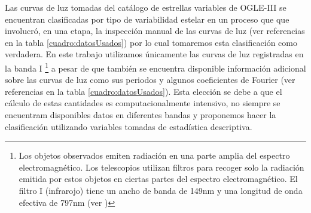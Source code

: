 \documentclass[letterpaper,12pt]{book}
\begin{document}
Las curvas de luz tomadas del catálogo de estrellas variables de OGLE-III se encuentran clasificadas por tipo de variabilidad estelar en un proceso que que involucró, en una etapa, la inspección manual de las curvas de luz (ver referencias en la tabla \ref{cuadro:datosUsados}) por lo cual tomaremos esta clasificación como verdadera. En este trabajo utilizamos únicamente las curvas de luz registradas en la banda I \footnote{Los objetos observados emiten radiación en una parte amplia del espectro electromagnético. Los telescopios utilizan filtros para recoger solo la radiación emitida por estos objetos en ciertas partes del espectro electromagnético. El filtro I (infrarojo) tiene un ancho de banda de 149nm y una longitud de onda efectiva de 797nm (ver \cite{karttunen_fundamental_2007})} a pesar de que también se encuentra disponible información adicional sobre las curvas de luz como sus periodos y algunos coeficientes de Fourier (ver referencias en la tabla \ref{cuadro:datosUsados}). Esta elección se debe a que el cálculo de estas cantidades es computacionalmente intensivo, no siempre se encuentram disponibles datos en diferentes bandas y proponemos hacer la clasificación utilizando variables tomadas de estadística descriptiva.
\end{document}
